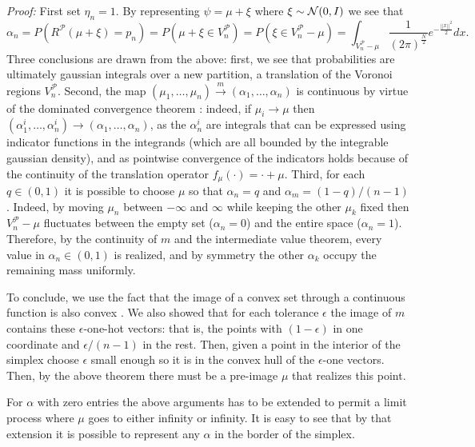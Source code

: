 \textit{Proof:} First set $\eta_n=1$. By representing $\psi = \mu + \xi$ where $\xi\sim\mathcal{N}(0, I)$ we see that
$$\alpha_n = P(R^\mathcal{P}(\mu + \xi) = p_n ) = P(\mu + \xi \in V^\mathcal{P}_{n}) = P(\xi \in V^\mathcal{P}_{n} - \mu) =  \int_{V^\mathcal{P}_{n} - \mu} \frac{1}{(2\pi)^\frac{N}{2}}e^{-\frac{||x||^2}{2}} dx.$$
Three conclusions are drawn from the above: first, we see that probabilities are ultimately gaussian integrals over a new partition, a translation of the Voronoi regions $V^\mathcal{P}_{n}$. Second,
the map $(\mu_1,\ldots,  \mu_n)\xrightarrow{m} (\alpha_1,\ldots, \alpha_n)$ is continuous by virtue of the dominated convergence theorem \cite{browder2012mathematical}: indeed, if $\mu_i\rightarrow \mu$ then $(\alpha^i_1,\ldots, \alpha^i_n) \rightarrow (\alpha_1,\ldots, \alpha_n)$, as the $\alpha^i_n$ are integrals that can be expressed using indicator functions in the integrands (which are all bounded by the integrable gaussian density), and as pointwise convergence of the indicators holds because of the continuity of the translation operator $f_\mu(\cdot) = \cdot + \mu$. Third, for each $q\in(0,1)$ it is possible to choose $\mu$ so that $\alpha_n =q$ and $\alpha_m = (1-q)/(n-1)$. Indeed, by moving $\mu_n$ between $-\infty$ and $\infty$ while keeping the other $\mu_k$ fixed then $V^\mathcal{P}_{n} - \mu$ fluctuates between the empty set ($\alpha_n =0$) and the entire space ($\alpha_n=1$). Therefore, by the continuity of $m$ and the intermediate value theorem, every value in $\alpha_n\in (0,1)$ is realized, and by symmetry the other $\alpha_k$ occupy the remaining mass uniformly. 

To conclude, we use the fact that the image of a convex set through a continuous function is also convex \cite{Rockafellar70}. We also showed that for each tolerance $\epsilon$ the image of $m$ contains these $\epsilon$-one-hot vectors: that is, the points with $(1-\epsilon)$ in one coordinate and $\epsilon/ (n-1)$ in the rest. Then, given a point in the interior of the simplex choose $\epsilon$ small enough so it is in the convex hull of the $\epsilon$-one vectors. Then, by the above theorem there must be a pre-image $\mu$ that realizes this point.

For $\alpha$ with zero entries the above arguments has to be extended to permit a limit process where $\mu$ goes to either infinity or infinity. It is easy to see that by that extension it is possible to represent any $\alpha$ in the border of the simplex.

